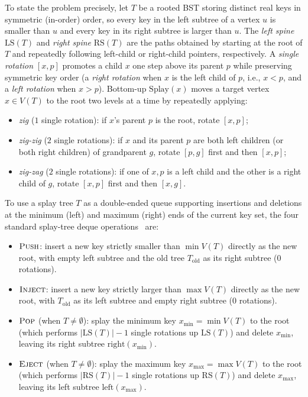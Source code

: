 \documentclass[11pt]{article}
\theoremstyle{definition}
\theoremstyle{remark}
\newcommand{\LS}{\mathrm{LS}}
\newcommand{\RS}{\mathrm{RS}}
\newcommand{\PUSH}{\textnormal{\scshape Push}}
\newcommand{\POP}{\textnormal{\scshape Pop}}
\newcommand{\INJECT}{\textnormal{\scshape Inject}}
\newcommand{\EJECT}{\textnormal{\scshape Eject}}
\begin{document}
To state the problem precisely, let $T$ be a rooted BST storing distinct real keys in symmetric (in-order) order, so every key in the left subtree of a vertex $u$ is smaller than $u$ and every key in its right subtree is larger than $u$. The \emph{left spine} $\LS(T)$ and \emph{right spine} $\RS(T)$ are the paths obtained by starting at the root of $T$ and repeatedly following left-child or right-child pointers, respectively. A \emph{single rotation} $[x, p]$ promotes a child $x$ one step above its parent $p$ while preserving symmetric key order (a \emph{right rotation} when $x$ is the left child of $p$, i.e., $x < p$, and a \emph{left rotation} when $x > p$). Bottom-up $\mathrm{Splay}(x)$ moves a target vertex $x \in V(T)$ to the root two levels at a time by repeatedly applying:
\begin{itemize}[leftmargin=2em, itemsep=1pt]
  \item \emph{zig} ($1$ single rotation): if $x$'s parent $p$ is the root, rotate $[x, p]$;
  \item \emph{zig-zig} ($2$ single rotations): if $x$ and its parent $p$ are both left children (or both right children) of grandparent $g$, rotate $[p, g]$ first and then $[x, p]$;
  \item \emph{zig-zag} ($2$ single rotations): if one of $x, p$ is a left child and the other is a right child of $g$, rotate $[x, p]$ first and then $[x, g]$.
\end{itemize}
To use a splay tree $T$ as a double-ended queue supporting insertions and deletions at the minimum (left) and maximum (right) ends of the current key set, the four standard splay-tree deque operations~\cite{Tarjan1985,Sundar1992,Pettie2008} are:
\begin{itemize}[leftmargin=2em, itemsep=1pt]
  \item $\PUSH$: insert a new key strictly smaller than $\min V(T)$ directly as the new root, with empty left subtree and the old tree $T_{\mathrm{old}}$ as its right subtree ($0$ rotations).
  \item $\INJECT$: insert a new key strictly larger than $\max V(T)$ directly as the new root, with $T_{\mathrm{old}}$ as its left subtree and empty right subtree ($0$ rotations).
  \item $\POP$ (when $T \ne \emptyset$): splay the minimum key $x_{\min} = \min V(T)$ to the root (which performs $|\LS(T)| - 1$ single rotations up $\LS(T)$) and delete $x_{\min}$, leaving its right subtree $\mathrm{right}(x_{\min})$.
  \item $\EJECT$ (when $T \ne \emptyset$): splay the maximum key $x_{\max} = \max V(T)$ to the root (which performs $|\RS(T)| - 1$ single rotations up $\RS(T)$) and delete $x_{\max}$, leaving its left subtree $\mathrm{left}(x_{\max})$.
\end{itemize}
\end{document}

